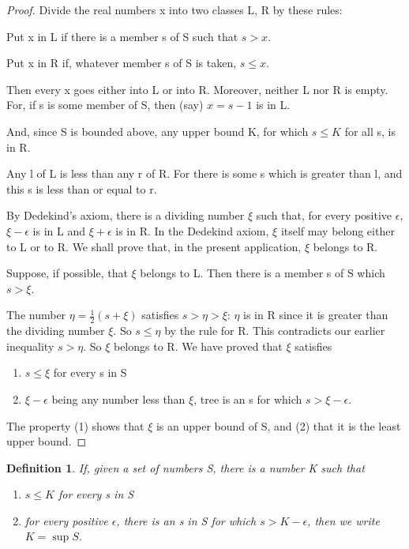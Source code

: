 \documentclass[12pt]{scrbook}
\newtheorem*{definition}{Definition}
\begin{document}
\begin{proof}
Divide the real numbers x into two classes L, R by these rules:

Put x in L if there is a member s of S such that $s > x$.

Put x in R if, whatever member s of S is taken, $s \leq x$.

Then every x goes either into L or into R.  Moreover, neither L nor R is empty.  For, if s is some member of S, then (say) $ x = s - 1 $ is in L.

And, since S is bounded above, any upper bound K, for which $s \leq K$ for all s, is in R. 

Any l of L is less than any r of R.  For there is some s which is greater than l, and this s is less than or equal to r.

By Dedekind's axiom, there is a dividing number $\xi$ such that, for every positive $\epsilon$, $\xi - \epsilon$ is in L and $\xi + \epsilon$ is in R.  In the Dedekind axiom, $\xi$ itself may belong either to L or to R.  We shall prove that, in the present application, $\xi$ belongs to R.

Suppose, if possible, that $\xi$ belongs to L.  Then there is a member s of S which $s > \xi$.

The number $\eta = \frac{1}{2}(s + \xi)$ satisfies $ s > \eta > \xi$: $\eta$ is in R since it is greater than the dividing number $\xi$. So $s \leq \eta$ by the rule for R.  This contradicts our earlier inequality $s > \eta$. So $\xi$ belongs to R.  We have proved that $\xi$ satisfies
\begin{enumerate}
	\item $s \leq \xi$ for every s in S
	\item $\xi - \epsilon$ being any number less than $\xi$, tree is an s for which $s > \xi - \epsilon$.
\end{enumerate}
The property (1) shows that $\xi$ is an upper bound of S, and (2) that it is the least upper bound.  
\end{proof}

\begin{definition}
\label{def-supremum}
If, given a set of numbers S, there is a number K such that
\begin{enumerate}
	\item $s \leq K$ for every s in S
	\item for every positive $\epsilon$, there is an s in S for which $s > K - \epsilon$, then we write $K = \sup S$.
\end{enumerate}
\end{definition}
\end{document}
